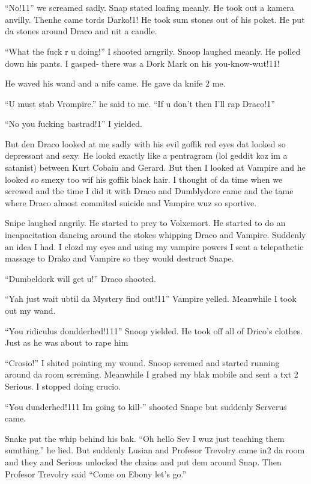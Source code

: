 \section{\chaptername~\thesection}



\enquote{No!11} we screamed sadly. Snap stated loafing meanly. He took out a kamera anvilly. Then\dotfill\newline he came tords Darko!1! He took sum stones out of his poket. He put da stones around Draco and nit a candle.

\enquote{What the fuck r u doing!} I shooted arngrily. Snoop laughed meanly. He polled down his pants. I gasped- there was a Dork Mark on his you-know-wut!11!

He waved his wand and a nife came. He gave da knife 2 me.

\enquote{U must stab Vrompire.} he said to me. \enquote{If u don't then I'll rap Draco!1}

\enquote{No you fucking bastrad!1} I yielded.

But den Draco looked at me sadly with his evil goffik red eyes dat looked so depressant and sexy. He lookd exactly like a pentragram (lol geddit koz im a satanist) between Kurt Cobain and Gerard. But then I looked at Vampire and he looked so smexy too wif his goffik black hair. I thought of da time when we screwed and the time I did it with Draco and Dumblydore came and the tame where Draco almost commited suicide and Vampire wuz so sportive.

Snipe laughed angrily. He started to prey to Volxemort. He started to do an incapacitation dancing around the stokes whipping Draco and Vampire. Suddenly an idea I had. I clozd my eyes and using my vampire powers I sent a telepathetic massage to Drako and Vampire so they would destruct Snape.

\enquote{Dumbeldork will get u!} Draco shooted.

\enquote{Yah just wait ubtil da Mystery find out!11} Vampire yelled. Meanwhile I took out my wand.

\enquote{You ridiculus dondderhed!111} Snoop yielded. He took off all of Drico's clothes. Just as he was about to rape him\dotfill

\enquote{Crosio!} I shited pointing my wound. Snoop scremed and started running around da room screming. Meanwhile I grabed my blak mobile and sent a txt 2 Serious. I stopped doing crucio.

\enquote{You dunderhed!111 Im going to kill-} shooted Snape but suddenly Serverus came.

Snake put the whip behind his bak. \enquote{Oh hello Sev I wuz just teaching them sumthing.} he lied. But suddenly Lusian and Profesor Trevolry came in2 da room and they and Serious unlocked the chains and put dem around Snap. Then Profesor Trevolry said \enquote{Come on Ebony let's go.}
